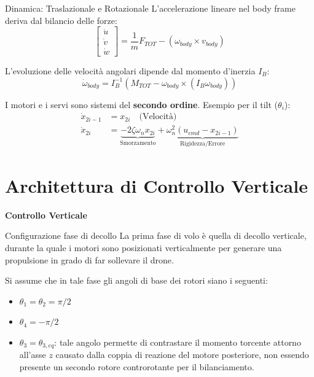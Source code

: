 \documentclass[aspectratio=169]{beamer} %
\begin{document}
\begin{frame}{Dinamica: Traslazionale e Rotazionale}
    L'accelerazione lineare nel body frame deriva dal bilancio delle forze:
    \begin{equation}
        \begin{bmatrix} \dot{u} \\ \dot{v} \\ \dot{w} \end{bmatrix} = \frac{1}{m} F_{TOT} - (\omega_{body} \times v_{body})
    \end{equation}
    
    L'evoluzione delle velocità angolari dipende dal momento d'inerzia $I_B$:  
    \begin{equation}
        \dot{\omega}_{body} = I_B^{-1} \left( M_{TOT} - \omega_{body} \times (I_B \omega_{body}) \right)
    \end{equation}

    I motori e i servi sono sistemi del \textbf{secondo ordine}. Esempio per il tilt ($\theta_i$):  
    \begin{align}
        \dot{x}_{2i-1} &= x_{2i} \quad \text{(Velocità)} \\
        \dot{x}_{2i} &= \underbrace{-2\zeta \omega_n x_{2i}}_{\text{Smorzamento}} + \underbrace{\omega_n^2 (u_{cmd} - x_{2i-1})}_{\text{Rigidezza/Errore}}
    \end{align}
\end{frame}

\section{Architettura di Controllo Verticale}

\begin{frame}
    \vfill
    \centering
    {\Huge \textbf{Controllo Verticale}}
    \vfill
\end{frame}

\begin{frame}{Configurazione fase di decollo}
    La prima fase di volo è quella di decollo verticale, durante la quale i motori sono posizionati verticalmente per generare una propulsione in grado di far sollevare il drone.
    
    \vspace{0.3cm}
    Si assume che in tale fase gli angoli di base dei rotori siano i seguenti:
    \begin{itemize}
        \item $\theta_1 = \theta_2 = \pi/2$
        \item $\theta_4 = -\pi/2$
        \item $\theta_3 = \theta_{3,eq}$: tale angolo permette di contrastare il momento torcente attorno all'asse $z$ causato dalla coppia di reazione del motore posteriore, non essendo presente un secondo rotore controrotante per il bilanciamento.
    \end{itemize}
\end{frame}
\end{document}
